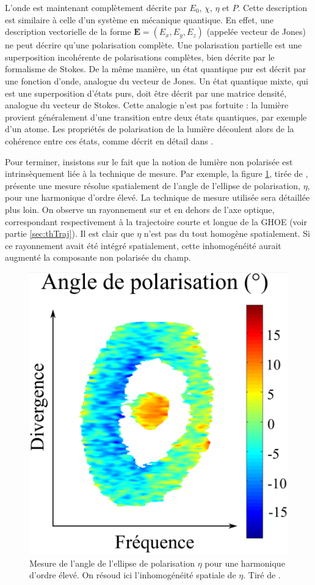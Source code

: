 L'onde est maintenant complètement décrite par $E_0$, $\chi$, $\eta$ et $P$. Cette description est similaire à celle d'un système en mécanique quantique. En effet, une description vectorielle de la forme $\bm{E}=(E_x,E_y,E_z)$ (appelée vecteur de Jones) ne peut décrire qu'une polarisation complète. Une polarisation partielle est une superposition incohérente de polarisations complètes, bien décrite par le formalisme de Stokes. De la même manière, un état quantique pur est décrit par une fonction d'onde, analogue du vecteur de Jones. Un état quantique mixte, qui est une superposition d'états purs, doit être décrit par une matrice densité, analogue du vecteur de Stokes. Cette analogie n'est pas fortuite : la lumière provient généralement d'une transition entre deux états quantiques, par exemple d'un atome. Les propriétés de polarisation de la lumière découlent alors de la cohérence entre ces états, comme décrit en détail dans . 

Pour terminer, insistons sur le fait que la notion de lumière non polarisée est intrinsèquement liée à la technique de mesure. Par exemple, la figure \ref{fig:angle_spatial}, tirée de , présente une mesure résolue spatialement de l'angle de l'ellipse de polarisation, $\eta$, pour une harmonique d'ordre élevé. La technique de mesure utilisée sera détaillée plus loin. On observe un rayonnement sur et en dehors de l'axe optique, correspondant respectivement à la trajectoire courte et longue de la GHOE (voir partie \ref{sec:thTraj}). Il est clair que $\eta$ n'est pas du tout homogène spatialement. Si ce rayonnement avait été intégré spatialement, cette inhomogénéité aurait augmenté la composante non polarisée du champ.

\begin{figure}[!ht]
\centering
\includegraphics[width=0.4\columnwidth]{Figures/Polar/angle_spatial.pdf}%
\caption{Mesure de l'angle de l'ellipse de polarisation $\eta$ pour une harmonique d'ordre élevé. On résoud ici l'inhomogénéité spatiale de $\eta$. Tiré de .}%
\label{fig:angle_spatial}%
\end{figure}

